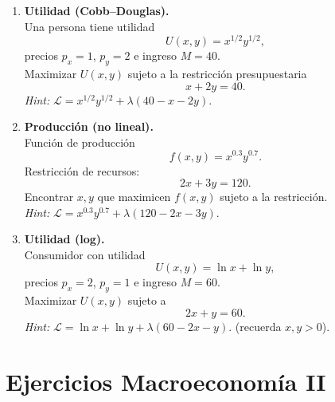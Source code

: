 \documentclass[a4paper,12pt]{article}
\begin{document}
\begin{enumerate}
    \item \textbf{Utilidad (Cobb--Douglas).} \\
    Una persona tiene utilidad
    \[
        U(x,y)=x^{1/2}y^{1/2},
    \]
    precios \(p_x=1\), \(p_y=2\) e ingreso \(M=40\). \\
    Maximizar \(U(x,y)\) sujeto a la restricción presupuestaria
    \[
        x+2y=40.
    \]
    \textit{Hint:} \(\mathcal{L}=x^{1/2}y^{1/2}+\lambda(40-x-2y)\).

    \item \textbf{Producción (no lineal).} \\
    Función de producción
    \[
        f(x,y)=x^{0.3}y^{0.7}.
    \]
    Restricción de recursos:
    \[
        2x+3y=120.
    \]
    Encontrar \(x,y\) que maximicen \(f(x,y)\) sujeto a la restricción. \\
    \textit{Hint:} \(\mathcal{L}=x^{0.3}y^{0.7}+\lambda(120-2x-3y)\).

    \item \textbf{Utilidad (log).} \\
    Consumidor con utilidad
    \[
        U(x,y)=\ln x+\ln y,
    \]
    precios \(p_x=2\), \(p_y=1\) e ingreso \(M=60\). \\
    Maximizar \(U(x,y)\) sujeto a
    \[
        2x+y=60.
    \]
    \textit{Hint:} \(\mathcal{L}=\ln x+\ln y+\lambda(60-2x-y)\). (recuerda \(x,y>0\)).
\end{enumerate}


\section*{Ejercicios Macroeconomía II}
\end{document}
